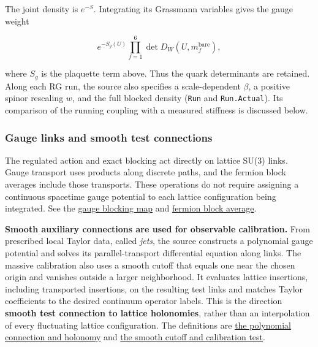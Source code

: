 \documentclass[
  11pt,
]{article}
\begin{document}
The joint density is \(e^{-S}\). Integrating its Grassmann variables
gives the gauge weight

\[
e^{-S_g(U)}\prod_{f=1}^{6}\det D_W(U,m_f^{\mathrm{bare}}),
\]

where \(S_g\) is the plaquette term above. Thus the quark determinants
are retained. Along each RG run, the source also specifies a
scale-dependent \(\beta\), a positive spinor rescaling \(w\), and the
full blocked density ({\small \nolinkurl{Run}} and
{\small \nolinkurl{Run.Actual}}). Its comparison of the running coupling
with a measured stiffness is discussed below.

\subsubsection{Gauge links and smooth test
connections}\label{gauge-links-and-smooth-test-connections}

The regulated action and exact blocking act directly on lattice SU(3)
links. Gauge transport uses products along discrete paths, and the
fermion block averages include those transports. These operations do not
require assigning a continuous spacetime gauge potential to each lattice
configuration being integrated. See the
\href{https://github.com/yang-mills-group/QCD/blob/main/provenance/supplied-comparator/frozen/reference/YM/RG/Block.lean\#L31}{gauge
blocking map} and
\href{https://github.com/yang-mills-group/QCD/blob/main/provenance/supplied-comparator/frozen/reference/YM/QCD/Flume/Collect.lean\#L39}{fermion
block average}.

\textbf{Smooth auxiliary connections are used for observable
calibration.} From prescribed local Taylor data, called \emph{jets}, the
source constructs a polynomial gauge potential and solves its
parallel-transport differential equation along links. The massive
calibration also uses a smooth cutoff that equals one near the chosen
origin and vanishes outside a larger neighborhood. It evaluates lattice
insertions, including transported insertions, on the resulting test
links and matches Taylor coefficients to the desired continuum operator
labels. This is the direction \textbf{smooth test connection to lattice
holonomies}, rather than an interpolation of every fluctuating lattice
configuration. The definitions are
\href{https://github.com/yang-mills-group/QCD/blob/main/provenance/supplied-comparator/frozen/reference/YM/Source/Local.lean\#L24}{the
polynomial connection and holonomy} and
\href{https://github.com/yang-mills-group/QCD/blob/main/provenance/supplied-comparator/frozen/reference/YM/Massive/Target/Calibration.lean\#L67}{the
smooth cutoff and calibration test}.
\end{document}
